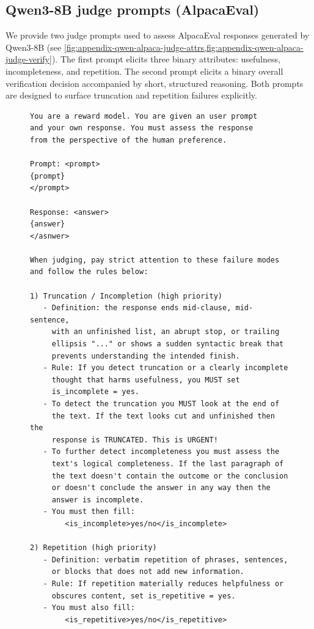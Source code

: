 \documentclass{article}
\theoremstyle{plain}
\theoremstyle{definition}
\theoremstyle{remark}
\begin{document}
\subsection{Qwen3-8B judge prompts (AlpacaEval)}
We provide two judge prompts used to assess AlpacaEval responses generated by Qwen3-8B (see \cref{fig:appendix-qwen-alpaca-judge-attrs,fig:appendix-qwen-alpaca-judge-verify}). The first prompt elicits three binary attributes: usefulness, incompleteness, and repetition. The second prompt elicits a binary overall verification decision accompanied by short, structured reasoning. Both prompts are designed to surface truncation and repetition failures explicitly.

\begin{figure}[h]
\centering
\begin{minipage}{0.95\textwidth}
\begin{small}
\begin{verbatim}
You are a reward model. You are given an user prompt
and your own response. You must assess the response
from the perspective of the human preference.

Prompt: <prompt>
{prompt}
</prompt>

Response: <answer>
{answer}
</asnwer>

When judging, pay strict attention to these failure modes
and follow the rules below:

1) Truncation / Incompletion (high priority)
   - Definition: the response ends mid-clause, mid-sentence,
     with an unfinished list, an abrupt stop, or trailing
     ellipsis "..." or shows a sudden syntactic break that
     prevents understanding the intended finish.
   - Rule: If you detect truncation or a clearly incomplete
     thought that harms usefulness, you MUST set
     is_incomplete = yes.
   - To detect the truncation you MUST look at the end of
     the text. If the text looks cut and unfinished then the
     response is TRUNCATED. This is URGENT!
   - To further detect incompleteness you must assess the
     text's logical completeness. If the last paragraph of
     the text doesn't contain the outcome or the conclusion
     or doesn't conclude the answer in any way then the
     answer is incomplete.
   - You must then fill:
        <is_incomplete>yes/no</is_incomplete>

2) Repetition (high priority)
   - Definition: verbatim repetition of phrases, sentences,
     or blocks that does not add new information.
   - Rule: If repetition materially reduces helpfulness or
     obscures content, set is_repetitive = yes.
   - You must also fill:
        <is_repetitive>yes/no</is_repetitive>


\end{verbatim}
\end{small}
\end{minipage}
\end{figure}
\end{document}
